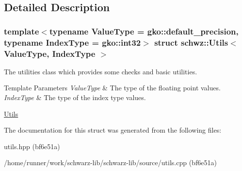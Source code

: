 \subsection{Detailed Description}
\subsubsection*{template$<$typename Value\+Type = gko\+::default\+\_\+precision, typename Index\+Type = gko\+::int32$>$\newline
struct schwz\+::\+Utils$<$ Value\+Type, Index\+Type $>$}

The utilities class which provides some checks and basic utilities. 


\begin{DoxyTemplParams}{Template Parameters}
{\em Value\+Type} & The type of the floating point values. \\
\hline
{\em Index\+Type} & The type of the index type values.\\
\hline
\end{DoxyTemplParams}
\hyperlink{group__utils}{Utils} 

The documentation for this struct was generated from the following files\+:\begin{DoxyCompactItemize}
\item 
utils.\+hpp (bf6e51a)\item 
/home/runner/work/schwarz-\/lib/schwarz-\/lib/source/utils.\+cpp (bf6e51a)\end{DoxyCompactItemize}
